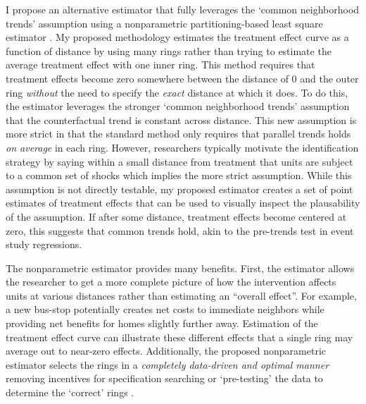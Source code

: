 \documentclass[12pt]{article}
\begin{document}
I propose an alternative estimator that fully leverages the `common neighborhood trends' assumption using a nonparametric partitioning-based least square estimator \citep{Cattaneo_Crump_Farrell_Feng_2019,Cattaneo_Farrell_Feng_2019}. My proposed methodology estimates the treatment effect curve as a function of distance by using many rings rather than trying to estimate the average treatment effect with one inner ring. This method requires that treatment effects become zero somewhere between the distance of 0 and the outer ring \emph{without} the need to specify the \emph{exact} distance at which it does. To do this, the estimator leverages the stronger `common neighborhood trends' assumption that the counterfactual trend is constant across distance. This new assumption is more strict in that the standard method only requires that parallel trends holds \emph{on average} in each ring. However, researchers typically motivate the identification strategy by saying within a small distance from treatment that units are subject to a common set of shocks which implies the more strict assumption. While this assumption is not directly testable, my proposed estimator creates a set of point estimates of treatment effects that can be used to visually inspect the plausability of the assumption. If after some distance, treatment effects become centered at zero, this suggests that common trends hold, akin to the pre-trends test in event study regressions.

The nonparametric estimator provides many benefits. First, the estimator allows the researcher to get a more complete picture of how the intervention affects units at various distances rather than estimating an ``overall effect''. For example, a new bus-stop potentially creates net costs to immediate neighbors while providing net benefits for homes slightly further away. Estimation of the treatment effect curve can illustrate these different effects that a single ring may average out to near-zero effects. Additionally, the proposed nonparametric estimator selects the rings in a \emph{completely data-driven and optimal manner} removing incentives for specification searching or `pre-testing' the data to determine the `correct' rings \citep{McCloskey_Michaillat,Andrews_Kasy}.
\end{document}
